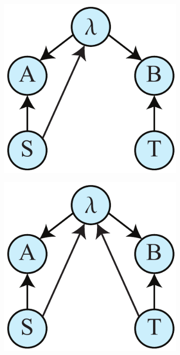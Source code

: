 \documentclass[12pt,onecolumn,nofootinbib]{revtex4-2}
\begin{document}
\begin{figure}[h]
        \begin{subfigure}[b]{0.18\textwidth}
                	\centering
        		\includegraphics[width=\textwidth]{retro-1}
		\subcaption{}
		\label{fig:retroa}
	\end{subfigure}
	\hspace{5em}
        \begin{subfigure}[b]{0.18\textwidth}
                	\centering
        	\includegraphics[width=\textwidth]{retro-3}

\end{subfigure}
\end{figure}
\end{document}
